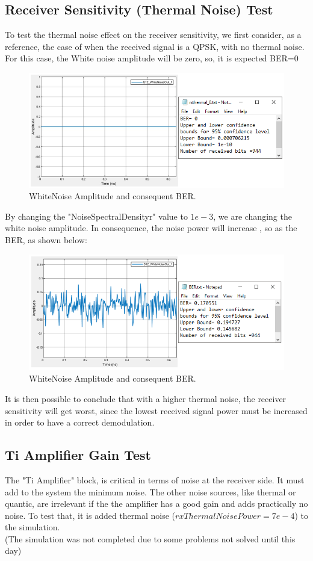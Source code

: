 \subsection*{Receiver Sensitivity (Thermal Noise) Test}
To test the thermal noise effect on the receiver sensitivity, we first consider, as a reference, the case of when the received signal is a QPSK, with no thermal noise.\\
For this case, the White noise amplitude will be zero, so, it is expected BER=0
\begin{figure}[H]
	\centering
	\includegraphics[scale=0.75]{./lib/m_qam_receiver/figures/whiteN0}
	\caption{WhiteNoise Amplitude and consequent BER.}\label{whiteN0}
\end{figure}
By changing the "NoiseSpectralDensityr" value to $1e-3$, we are changing the white noise amplitude. In consequence, the noise power will increase , so as the BER, as shown below:
\begin{figure}[H]
	\centering
	\includegraphics[scale=0.75]{./lib/m_qam_receiver/figures/whiteN10}
	\caption{WhiteNoise Amplitude and consequent BER.}\label{whiteN10}
\end{figure}
It is then possible to conclude that with a higher thermal noise, the receiver sensitivity will get worst, since the lowest received signal power must be increased in order to have a correct demodulation.
\subsection*{Ti Amplifier Gain Test}
The "Ti Amplifier" block, is critical in terms of noise at the receiver side. It must add to the system the minimum noise. The other noise sources, like thermal or quantic, are irrelevant if the the amplifier has a good gain and adds practically no noise. To test that, it is added thermal noise ($rxThermalNoisePower=7e-4$) to the simulation.\\
(The simulation was not completed due to some problems not solved until this day)



